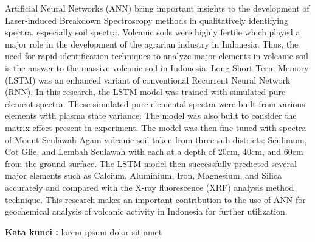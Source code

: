 \begin{abstractind}

Artificial Neural Networks (ANN) bring important insights to the development of Laser-induced Breakdown Spectroscopy methods in qualitatively identifying spectra, especially soil spectra. Volcanic soils were highly fertile which played a major role in the development of the agrarian industry in Indonesia. Thus, the need for rapid identification techniques to analyze major elements in volcanic soil is the answer to the massive volcanic soil in Indonesia. Long Short-Term Memory (LSTM) was an enhanced variant of conventional Recurrent Neural Network (RNN). In this research, the LSTM model was trained with simulated pure element spectra. These simulated pure elemental spectra were built from various elements with plasma state variance. The model was also built to consider the matrix effect present in experiment. The model was then fine-tuned with spectra of Mount Seulawah Agam volcanic soil taken from three sub-districts: Seulimum, Cot Glie, and Lembah Seulawah with each at a depth of 20cm, 40cm, and 60cm from the ground surface. The LSTM model then successfully predicted several major elements such as Calcium, Aluminium, Iron, Magnesium, and Silica accurately and compared with the X-ray fluorescence (XRF) analysis method technique. This research makes an important contribution to the use of ANN for geochemical analysis of volcanic activity in Indonesia for further utilization.

\bigskip
\noindent
\textbf{Kata kunci :} lorem ipsum dolor sit amet
\end{abstractind}